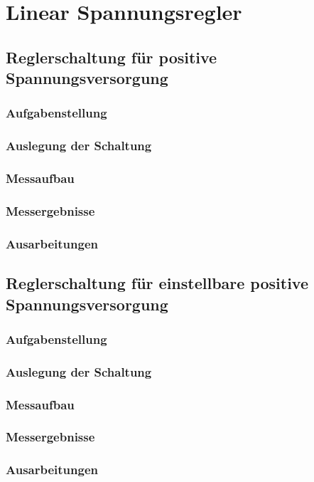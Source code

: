 \chapter{Linear Spannungsregler }
	\section{Reglerschaltung für positive Spannungsversorgung}
		\subsection{Aufgabenstellung}

		\subsection{Auslegung der Schaltung}

		\subsection{Messaufbau}

		\subsection{Messergebnisse}

		\subsection{Ausarbeitungen}
		
	\section{Reglerschaltung für einstellbare positive Spannungsversorgung }
		\subsection{Aufgabenstellung}

		\subsection{Auslegung der Schaltung}

		\subsection{Messaufbau}

		\subsection{Messergebnisse}

		\subsection{Ausarbeitungen}
		
